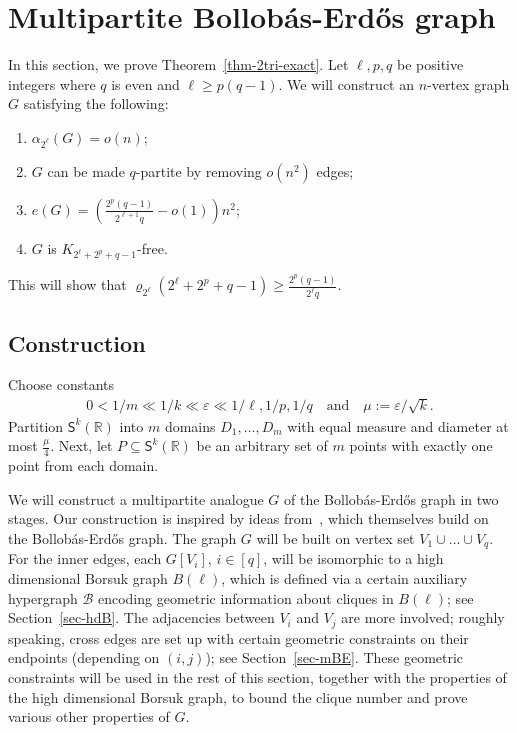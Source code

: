 \documentclass[10pt,a4paper]{article}
\newcounter{propcounter}
\newcommand{\COMMENT}[1]{}
\renewcommand{\COMMENT}{\footnote}
\theoremstyle{definition}
\def\al{{\alpha}}
\def\eps{{\varepsilon}}
\newcommand{\cB}{\mathcal{B}}
\newcommand{\sS}{\mathsf{S}}
\newcommand{\sR}{\mathbb{R}}
\begin{document}


\section{Multipartite Bollob\'as-Erd\H{o}s graph}\label{sec-LB-Thm1}
In this section, we prove Theorem~\ref{thm-2tri-exact}. Let $\ell,p,q$ be positive integers where $q$ is even and $\ell \geq p(q-1)$. We will construct an $n$-vertex graph $G$ satisfying the following:
\begin{enumerate}[label = {\bfseries \Alph{propcounter}\arabic{enumi}}]
	\item\label{it:MBE-ind} $\al_{2^\ell}(G)= o(n)$;
	\item\label{it:MBE-inner} $G$ can be made $q$-partite by removing $o(n^2)$ edges;
	\item\label{it:MBE-edges} $e(G)=\left(\frac{2^p(q-1)}{2^{\ell+1} q}-o(1)\right)n^2$;
	\item\label{it:MBE-clique} $G$ is $K_{2^\ell+2^p+q-1}$-free.
\end{enumerate}
This will show that $\varrho_{2^\ell}(2^\ell+2^p+q-1) \geq \frac{2^p(q-1)}{2^\ell q}$. 


\subsection{Construction}
Choose constants%
\begin{align}
0 < 1/m \ll 1/k \ll \eps \ll 1/\ell,1/p,1/q \quad\text{and}\quad\mu:=\eps/\sqrt{k}.
\end{align}
Partition $\sS^{k}(\sR)$ into $m$ domains $D_1,\ldots,D_m$ with equal measure and  diameter at most $\frac{\mu}{4}$. Next, let $P\subseteq \sS^{k}(\sR)$ be an arbitrary set of $m$ points with exactly one point from each domain. 

We will construct a multipartite analogue $G$ of the Bollob\'as-Erd\H{o}s graph in two stages. Our construction is inspired by ideas from~\cite{BL-1,BL-2, Rodl}, which themselves build on the Bollob\'as-Erd\H os graph. The graph $G$ will be built on vertex set $V_1\cup\ldots\cup V_q$. For the inner edges, each $G[V_i]$, $i\in [q]$, will be isomorphic to a high dimensional Borsuk graph $B(\ell)$, which is defined via a certain auxiliary hypergraph $\cB$ encoding geometric information about cliques in $B(\ell)$; see Section~\ref{sec-hdB}. The adjacencies between $V_i$ and $V_j$ are more involved; roughly speaking, cross edges are set up with certain geometric constraints on their endpoints (depending on $(i,j)$); see Section~\ref{sec-mBE}. These geometric constraints will be used in the rest of this section, together with the properties of the high dimensional Borsuk graph, to bound the clique number and prove various other properties of $G$.
\end{document}
